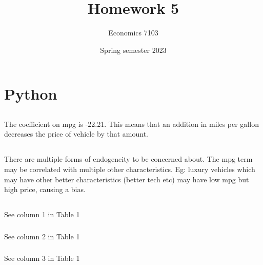 \documentclass{article}
\title{Homework 5}
\author{Economics 7103}
\date{Spring semester 2023}
\begin{document}
\maketitle
\section{Python}
\subsection{}
The coefficient on mpg is -22.21. This means that an addition in miles per gallon decreases the price of vehicle by that amount.
\newline

\subsection{}
There are multiple forms of endogeneity to be concerned about. The mpg term may be correlated with multiple other characteristics. Eg: luxury vehicles which may have other better characteristics (better tech etc) may have low mpg but high price, causing a bias.
\newline
\newline

\subsection{}
\subsubsection{}See column 1 in Table 1
\subsubsection{}See column 2 in Table 1
\subsubsection{}See column 3 in Table 1
\end{document}
